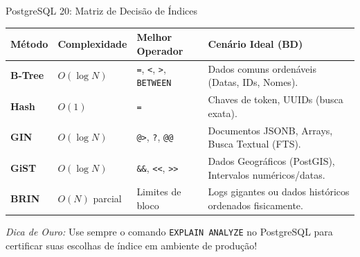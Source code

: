 \documentclass[9pt]{beamer}
\begin{document}
\begin{frame}{PostgreSQL 20: Matriz de Decisão de Índices}
    \begin{center}
    \renewcommand{\arraystretch}{1.3}
    \scriptsize
    \begin{tabular}{|l|l|l|p{3.5cm}|}
        \hline
        \textbf{Método} & \textbf{Complexidade} & \textbf{Melhor Operador} & \textbf{Cenário Ideal (BD)} \\
        \hline
        \textbf{B-Tree} & $O(\log N)$ & \texttt{=}, \texttt{<}, \texttt{>}, \texttt{BETWEEN} & Dados comuns ordenáveis (Datas, IDs, Nomes). \\
        \hline
        \textbf{Hash} & $O(1)$ & \texttt{=} & Chaves de token, UUIDs (busca exata). \\
        \hline
        \textbf{GIN} & $O(\log N)$ & \texttt{@>}, \texttt{?}, \texttt{@@} & Documentos JSONB, Arrays, Busca Textual (FTS). \\
        \hline
        \textbf{GiST} & $O(\log N)$ & \texttt{\&\&}, \texttt{<<}, \texttt{>>} & Dados Geográficos (PostGIS), Intervalos numéricos/datas. \\
        \hline
        \textbf{BRIN} & $O(N)$ parcial & Limites de bloco & Logs gigantes ou dados históricos ordenados fisicamente. \\
        \hline
    \end{tabular}
    \end{center}
    
    \vspace{0.25cm}
    \textit{Dica de Ouro:} Use sempre o comando \texttt{EXPLAIN ANALYZE} no PostgreSQL para certificar suas escolhas de índice em ambiente de produção!
\end{frame}
\end{document}
